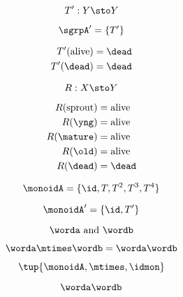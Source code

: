 {\begin{forslides}
        \begin{equation}
            T' : Y \sto Y
        \end{equation}

        \begin{equation}
            \sgrpA' = \{T' \}
        \end{equation}

        \begin{align*}
            T'(\text{alive}) & =  \dead \\
            T' (\dead)       & = \dead
        \end{align*}

        \begin{equation}
            R: X \sto Y
        \end{equation}

        \begin{align*}
            R(\text{sprout}) & = \text{alive} \\
            R(\yng)          & =  \text{alive} \\
            R(\mature)       & = \text{alive} \\
            R( \old)         & = \text{alive} \\
            R (\dead)        & = \dead
        \end{align*}

        \begin{equation}
            \monoidA = \{ \id, T, T^2, T^3, T^4 \}
        \end{equation}

        \begin{equation}
            \monoidA' = \{ \id, T' \}
        \end{equation}

        \begin{equation*}
            \worda \text{ and } \wordb
        \end{equation*}

        \begin{equation*}
            \label{eq:string-semigroup-wordab-2}
            \worda \mtimes  \wordb =  \worda \wordb
        \end{equation*}

        \begin{equation}
            \tup{ \monoidA, \mtimes, \idmon}
        \end{equation}

        \begin{equation*}
            \label{eq:string-semigroup-wordab-concat-2}
            \worda \wordb
        \end{equation*}


\end{forslides}}
